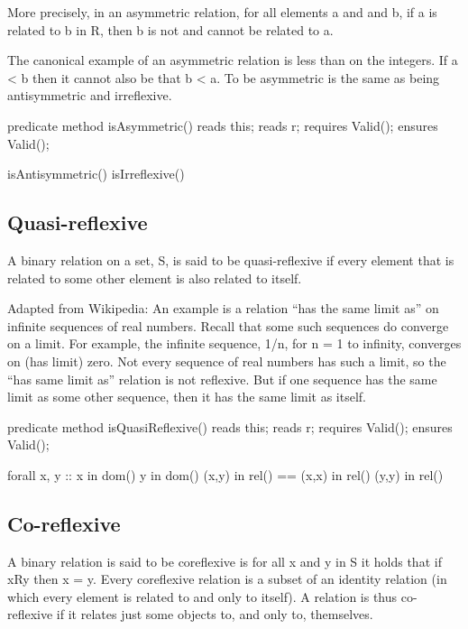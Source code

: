 \documentclass[letterpaper,10pt,english]{sphinxmanual}
\begin{document}
More precisely, in an asymmetric relation, for all elements a and and
b, if a is related to b in R, then b is not and cannot be related
to a.

The canonical example of an asymmetric relation is less than on the
integers. If a \textless{} b then it cannot also be that b \textless{} a. To be asymmetric
is the same as being antisymmetric and irreflexive.

\begin{sphinxVerbatim}[commandchars=\\\{\}]
predicate method isAsymmetric()
    reads this;
    reads r;
    requires Valid();
    ensures Valid();

\PYGZob{}
    isAntisymmetric() \PYGZam{}\PYGZam{} isIrreflexive()
\PYGZcb{}
\end{sphinxVerbatim}


\subsection{Quasi-reflexive}
\label{\detokenize{08-relations:quasi-reflexive}}
A binary relation on a set, S, is said to be quasi-reflexive if every
element that is related to some other element is also related to
itself.

Adapted from Wikipedia: An example is a relation “has the same limit
as” on infinite sequences of real numbers. Recall that some such
sequences do converge on a limit. For example, the infinite sequence,
1/n, for n = 1 to infinity, converges on (has limit) zero. Not every
sequence of real numbers has such a limit, so the “has same limit as”
relation is not reflexive. But if one sequence has the same limit as
some other sequence, then it has the same limit as itself.

\begin{sphinxVerbatim}[commandchars=\\\{\}]
predicate method isQuasiReflexive()
     reads this;
    reads r;
    requires Valid();
    ensures Valid();

\PYGZob{}
    forall x, y ::
        x in dom() \PYGZam{}\PYGZam{} y in dom() \PYGZam{}\PYGZam{} (x,y) in rel() ==\PYGZgt{}
            (x,x) in rel() \PYGZam{}\PYGZam{} (y,y) in rel()
\PYGZcb{}
\end{sphinxVerbatim}


\subsection{Co-reflexive}
\label{\detokenize{08-relations:co-reflexive}}
A binary relation is said to be coreflexive is for all x and y in S it
holds that if xRy then x = y.  Every coreflexive relation is a subset
of an identity relation (in which every element is related to and only
to itself). A relation is thus co-reflexive if it relates just some
objects to, and only to, themselves.
\end{document}

